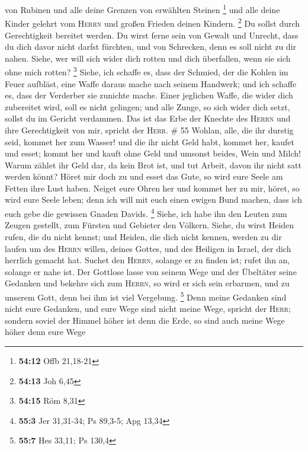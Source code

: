 von Rubinen und alle deine Grenzen von erwählten Steinen \footnote{\textbf{54:12}
  Offb 21,18-21}  und alle deine Kinder gelehrt vom
\textsc{Herrn} und großen Frieden deinen Kindern. \footnote{\textbf{54:13}
  Joh 6,45}  Du sollst durch Gerechtigkeit bereitet
werden. Du wirst ferne sein von Gewalt und Unrecht, dass du dich davor
nicht darfst fürchten, und von Schrecken, denn es soll nicht zu dir
nahen.  Siehe, wer will sich wider dich rotten und dich
überfallen, wenn sie sich ohne mich rotten? \footnote{\textbf{54:15} Röm
  8,31}  Siehe, ich schaffe es, dass der Schmied, der die
Kohlen im Feuer aufbläst, eine Waffe daraus mache nach seinem Handwerk;
und ich schaffe es, dass der Verderber sie zunichte mache.
 Einer jeglichen Waffe, die wider dich zubereitet wird,
soll es nicht gelingen; und alle Zunge, so sich wider dich setzt, sollst
du im Gericht verdammen. Das ist das Erbe der Knechte des \textsc{Herrn}
und ihre Gerechtigkeit von mir, spricht der \textsc{Herr}. \# 55
 Wohlan, alle, die ihr durstig seid, kommet her zum
Wasser! und die ihr nicht Geld habt, kommet her, kaufet und esset; kommt
her und kauft ohne Geld und umsonst beides, Wein und Milch!
 Warum zählet ihr Geld dar, da kein Brot ist, und tut
Arbeit, davon ihr nicht satt werden könnt? Höret mir doch zu und esset
das Gute, so wird eure Seele am Fetten ihre Lust haben. 
Neiget eure Ohren her und kommet her zu mir, höret, so wird eure Seele
leben; denn ich will mit euch einen ewigen Bund machen, dass ich euch
gebe die gewissen Gnaden Davids. \footnote{\textbf{55:3} Jer 31,31-34;
  Ps 89,3-5; Apg 13,34}  Siehe, ich habe ihn den Leuten
zum Zeugen gestellt, zum Fürsten und Gebieter den Völkern.
 Siehe, du wirst Heiden rufen, die du nicht kennst; und
Heiden, die dich nicht kennen, werden zu dir laufen um des
\textsc{Herrn} willen, deines Gottes, und des Heiligen in Israel, der
dich herrlich gemacht hat.  Suchet den \textsc{Herrn},
solange er zu finden ist; rufet ihn an, solange er nahe ist.
 Der Gottlose lasse von seinem Wege und der Übeltäter
seine Gedanken und bekehre sich zum \textsc{Herrn}, so wird er sich sein
erbarmen, und zu unserem Gott, denn bei ihm ist viel Vergebung.
\footnote{\textbf{55:7} Hes 33,11; Ps 130,4}  Denn meine
Gedanken sind nicht eure Gedanken, und eure Wege sind nicht meine Wege,
spricht der \textsc{Herr};  sondern soviel der Himmel
höher ist denn die Erde, so sind auch meine Wege höher denn eure Wege
